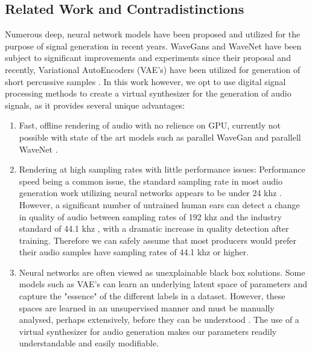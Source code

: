 \documentclass{nime-alternate} %
\begin{document}
\subsection{Related Work and Contradistinctions}
\label{related}
Numerous deep, neural network models have been proposed and utilized for the purpose of signal generation in recent years. WaveGans and WaveNet have been subject to significant improvements and experiments since their proposal \cite{nsynth2017} and recently, Variational AutoEncoders (VAE's) have been utilized for generation of short percussive samples \cite{aouameur2019neural,ramires2019timbfeat}. In this work however, we opt to use digital signal processing methods to create a virtual synthesizer for the generation of audio signals, as it provides several unique advantages:
\begin{enumerate}[label=\roman*]
  \item Fast, offline rendering of audio with no relience on GPU, currently not possible with state of the art models such as parallel WaveGan \cite{yamamoto2019parallel} and parallell WaveNet \cite{oord2017parallel}. 
  \item Rendering at high sampling rates with little performance issues: Performance speed being a common issue, the standard sampling rate in most audio generation work utilizing neural networks appears to be under 24 khz \cite{yamamoto2019parallel,oord2017parallel,aouameur2019neural,ramires2019timbfeat}. However, a significant number of untrained human ears can detect a change in quality of audio between sampling rates of 192 khz and the industry standard of 44.1 khz \cite{reiss2016meta}, with a dramatic increase in quality detection after training. Therefore we can safely assume that most producers would prefer their audio samples have sampling rates of 44.1 khz or higher. 
  \item Neural networks are often viewed as unexplainable black box solutions. Some models such as VAE's can learn an underlying latent space of parameters and capture the "essence" of the different labels in a dataset. However, these spaces are learned in an unsupervised manner and must be manually analysed, perhaps extensively, before they can be understood \cite{esling2018generative}. The use of a virtual synthesizer for audio generation makes our parameters readily understandable and easily modifiable. \\
  
\end{enumerate}
\end{document}
